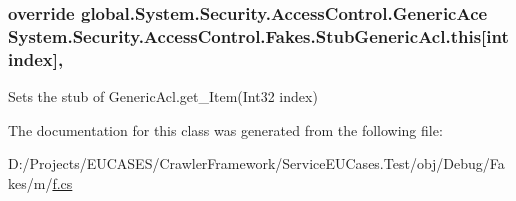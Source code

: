 \hypertarget{class_system_1_1_security_1_1_access_control_1_1_fakes_1_1_stub_generic_acl_a3cbaf1556a0fdb472a8f281b82a76250}{
\subsubsection[{this[int index]}]{\setlength{\rightskip}{0pt plus 5cm}override global.\-System.\-Security.\-Access\-Control.\-Generic\-Ace System.\-Security.\-Access\-Control.\-Fakes.\-Stub\-Generic\-Acl.\-this\mbox{[}int {\bf index}\mbox{]}\hspace{0.3cm}{\ttfamily [get]}, {\ttfamily [set]}}}\label{class_system_1_1_security_1_1_access_control_1_1_fakes_1_1_stub_generic_acl_a3cbaf1556a0fdb472a8f281b82a76250}


Sets the stub of Generic\-Acl.\-get\-\_\-\-Item(\-Int32 index)



The documentation for this class was generated from the following file\-:\begin{DoxyCompactItemize}
\item 
D\-:/\-Projects/\-E\-U\-C\-A\-S\-E\-S/\-Crawler\-Framework/\-Service\-E\-U\-Cases.\-Test/obj/\-Debug/\-Fakes/m/\hyperlink{m_2f_8cs}{f.\-cs}\end{DoxyCompactItemize}
